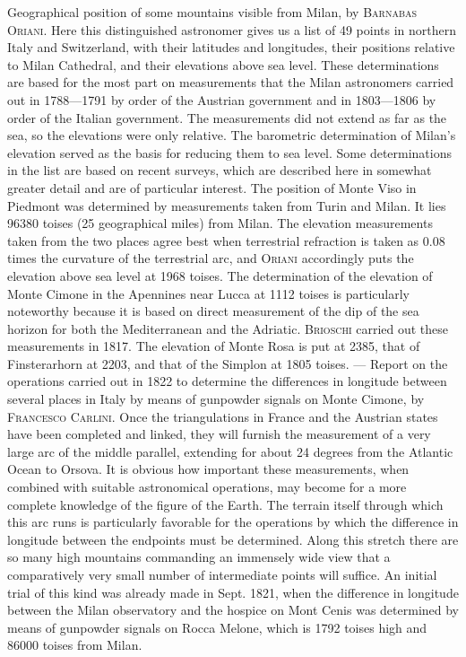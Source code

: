 Geographical position of some mountains visible from Milan, by \textsc{Barnabas Oriani}.
Here this distinguished astronomer gives us a list of 49 points in northern Italy and Switzerland, with their latitudes and longitudes, their positions relative to Milan Cathedral, and their elevations above sea level.
These determinations are based for the most part on measurements that the Milan astronomers carried out in 1788---1791 by order of the Austrian government and in 1803---1806 by order of the Italian government.
The measurements did not extend as far as the sea, so the elevations were only relative. The barometric determination of Milan's elevation served as the basis for reducing them to sea level.
Some determinations in the list are based on recent surveys, which are described here in somewhat greater detail and are of particular interest.
The position of Monte Viso in Piedmont was determined by measurements taken from Turin and Milan. It lies 96380 toises (25 geographical miles) from Milan.
The elevation measurements taken from the two places agree best when terrestrial refraction is taken as 0.08 times the curvature of the terrestrial arc, and \textsc{Oriani} accordingly puts the elevation above sea level at 1968 toises.
The determination of the elevation of Monte Cimone in the Apennines near Lucca at 1112 toises is particularly noteworthy because it is based on direct measurement of the dip of the sea horizon for both the Mediterranean and the Adriatic. \textsc{Brioschi} carried out these measurements in 1817.
The elevation of Monte Rosa is put at 2385, that of Finsterarhorn at 2203, and that of the Simplon at 1805 toises. --- Report on the operations carried out in 1822 to determine the differences in longitude between several places in Italy by means of gunpowder signals on Monte Cimone, by \textsc{Francesco Carlini}.
Once the triangulations in France and the Austrian states have been completed and linked, they will furnish the measurement of a very large arc of the middle parallel, extending for about 24 degrees from the Atlantic Ocean to Orsova.
It is obvious how important these measurements, when combined with suitable astronomical operations, may become for a more complete knowledge of the figure of the Earth.
The terrain itself through which this arc runs is particularly favorable for the operations by which the difference in longitude between the endpoints must be determined. Along this stretch there are so many high mountains commanding an immensely wide view that a comparatively very small number of intermediate points will suffice.
An initial trial of this kind was already made in Sept. 1821, when the difference in longitude between the Milan observatory and the hospice on Mont Cenis was determined by means of gunpowder signals on Rocca Melone, which is 1792 toises high and 86000 toises from Milan.
